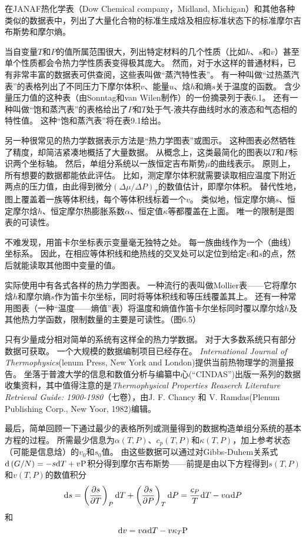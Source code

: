 在JANAF热化学表（Dow Chemical company，Midland, Michigan）和其他各种类似的数据表中，列出了大量化合物的标准生成焓及相应标准状态下的标准摩尔吉布斯势和摩尔熵。

当自变量$T$和$P$的值所属范围很大，列出特定材料的几个性质（比如$h$、$s$和$v$）甚至单个性质都会令热力学性质表变得极其庞大。
然而，对于水这样的普通材料，已有非常丰富的数据表可供查阅，这些表叫做“蒸汽特性表”。
有一种叫做“过热蒸汽表”的表格列出了不同压力下摩尔体积$v$、能量$u$、焓$h$和熵$s$关于温度的函数。
含少量压力值的这种表（由Sonntag和van Wilen制作）的一份摘录列于表6.1。%
还有一种叫做“饱和蒸汽表”的表格给出了$P$和$T$处于气-液共存曲线时水的液态和气态相的特性值。
这种“饱和蒸汽表”将在表9.1给出。%

另一种很常见的热力学数据表示方法是“热力学图表”或图示。
这种图表必然牺牲了精度，却简洁紧凑地概括了大量数据。
从概念上，这类最简化的图表以$T$和$P$标识两个坐标轴。
然后，单组分系统以一族恒定吉布斯势$\mu$的曲线表示。
原则上，所有想要的数据都能依此评估。
比如，测定摩尔体积就需要读取相应温度下附近两点的压力值，由此得到微分$\left(\Delta\mu/\Delta P\right)_T$的数值估计，即摩尔体积。
替代性地，图上覆盖着一族等体积线，每个等体积线标着一个$v$。
类似地，恒定摩尔熵$s$、恒定摩尔焓$h$、恒定摩尔热膨胀系数$\alpha$、恒定值$\kappa$等都覆盖在上面。
唯一的限制是图表的可读性。

不难发现，用笛卡尔坐标表示变量毫无独特之处。
每一族曲线作为一个（曲线）坐标系。
因此，在相应等体积线和绝热线的交叉处可以定位到给定$v$和$s$的点，然后就能读取其他图中变量的值。

实际使用中有各式各样的热力学图表。
一种流行的表叫做Mollier表——它将摩尔焓$h$和摩尔熵$s$作为笛卡尔坐标，同时将等体积线和等压线覆盖其上。
还有一种常用图表（一种“温度——熵值”表）将温度和熵值作笛卡尔坐标同时覆以摩尔焓$h$及其他热力学函数，限制数量的主要是可读性。（图6.5）%

只有少量成分相对简单的系统有这样全的热力学数据。
对于大多数系统只有部分数据可获取。
一个大规模的数据编制项目已经存在。
\textit{International Journal of Thermophysics}(lenum Press, New York and London)提供当前热物理学的测量报告。
坐落于普渡大学的信息和数值分析与编纂中心(“CINDAS”)出版一系列的数据收集资料，其中值得注意的是\textit{Thermophysical Properties Reaserch Literature Retrieval Guide: 1900-1980}（七卷），由J. F. Chancy 和 V. Ramdas(Plenum Publishing Corp., New Yoor, 1982)编辑。

最后，简单回顾一下通过最少的表格所列或测量得到的数据构造单组分系统的基本方程的过程。
所需最少信息为$\alpha(T,P)$、$c_p(T,P)$和$\kappa(T,P)$，加上参考状态（可能是信息焓）的$v_0$和$s_0$值。
由这些数据可以通过对Gibbs-Duhem关系式$\mathrm{d} \left(G/N\right)=-s\mathrm{d} T+v\text{P}$积分得到摩尔吉布斯势——前提是由以下方程得到$s(T,P)$和$v(T,P)$的数值积分
\[\mathrm{d} s=\left(\frac{\partial s}{\partial T}\right)_P\mathrm{d} T+\left(\frac{\partial s}{\partial P}\right)_T\mathrm{d} P=\frac{c_P}{T}\mathrm{d} T-v\alpha\mathrm{d} P\]
和
\[\mathrm{d} v=v\alpha\mathrm{d} T-v\kappa_T\text{P}\]

